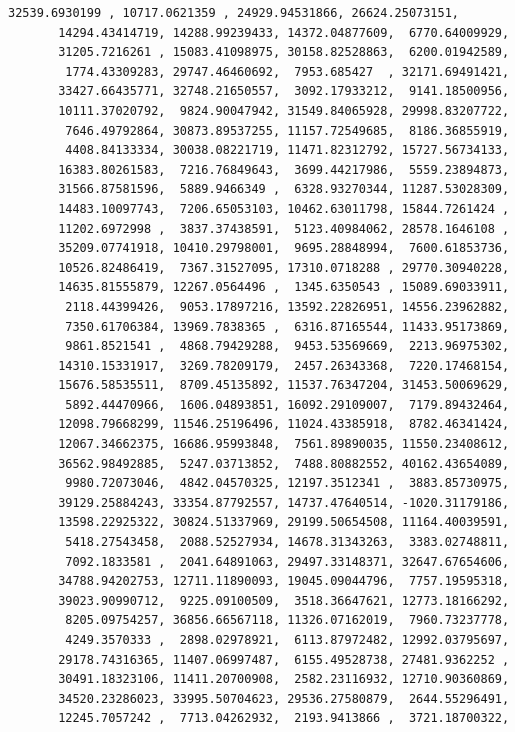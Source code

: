 \documentclass[11pt,a4paper]{report}
\begin{document}
\begin{tcolorbox}[breakable, size=fbox, boxrule=.5pt, pad at break*=1mm, opacityfill=0]
\begin{Verbatim}[commandchars=\\\{\}]
       32539.6930199 , 10717.0621359 , 24929.94531866, 26624.25073151,
       14294.43414719, 14288.99239433, 14372.04877609,  6770.64009929,
       31205.7216261 , 15083.41098975, 30158.82528863,  6200.01942589,
        1774.43309283, 29747.46460692,  7953.685427  , 32171.69491421,
       33427.66435771, 32748.21650557,  3092.17933212,  9141.18500956,
       10111.37020792,  9824.90047942, 31549.84065928, 29998.83207722,
        7646.49792864, 30873.89537255, 11157.72549685,  8186.36855919,
        4408.84133334, 30038.08221719, 11471.82312792, 15727.56734133,
       16383.80261583,  7216.76849643,  3699.44217986,  5559.23894873,
       31566.87581596,  5889.9466349 ,  6328.93270344, 11287.53028309,
       14483.10097743,  7206.65053103, 10462.63011798, 15844.7261424 ,
       11202.6972998 ,  3837.37438591,  5123.40984062, 28578.1646108 ,
       35209.07741918, 10410.29798001,  9695.28848994,  7600.61853736,
       10526.82486419,  7367.31527095, 17310.0718288 , 29770.30940228,
       14635.81555879, 12267.0564496 ,  1345.6350543 , 15089.69033911,
        2118.44399426,  9053.17897216, 13592.22826951, 14556.23962882,
        7350.61706384, 13969.7838365 ,  6316.87165544, 11433.95173869,
        9861.8521541 ,  4868.79429288,  9453.53569669,  2213.96975302,
       14310.15331917,  3269.78209179,  2457.26343368,  7220.17468154,
       15676.58535511,  8709.45135892, 11537.76347204, 31453.50069629,
        5892.44470966,  1606.04893851, 16092.29109007,  7179.89432464,
       12098.79668299, 11546.25196496, 11024.43385918,  8782.46341424,
       12067.34662375, 16686.95993848,  7561.89890035, 11550.23408612,
       36562.98492885,  5247.03713852,  7488.80882552, 40162.43654089,
        9980.72073046,  4842.04570325, 12197.3512341 ,  3883.85730975,
       39129.25884243, 33354.87792557, 14737.47640514, -1020.31179186,
       13598.22925322, 30824.51337969, 29199.50654508, 11164.40039591,
        5418.27543458,  2088.52527934, 14678.31343263,  3383.02748811,
        7092.1833581 ,  2041.64891063, 29497.33148371, 32647.67654606,
       34788.94202753, 12711.11890093, 19045.09044796,  7757.19595318,
       39023.90990712,  9225.09100509,  3518.36647621, 12773.18166292,
        8205.09754257, 36856.66567118, 11326.07162019,  7960.73237778,
        4249.3570333 ,  2898.02978921,  6113.87972482, 12992.03795697,
       29178.74316365, 11407.06997487,  6155.49528738, 27481.9362252 ,
       30491.18323106, 11411.20700908,  2582.23116932, 12710.90360869,
       34520.23286023, 33995.50704623, 29536.27580879,  2644.55296491,
       12245.7057242 ,  7713.04262932,  2193.9413866 ,  3721.18700322,

\end{Verbatim}
\end{tcolorbox}
\end{document}
